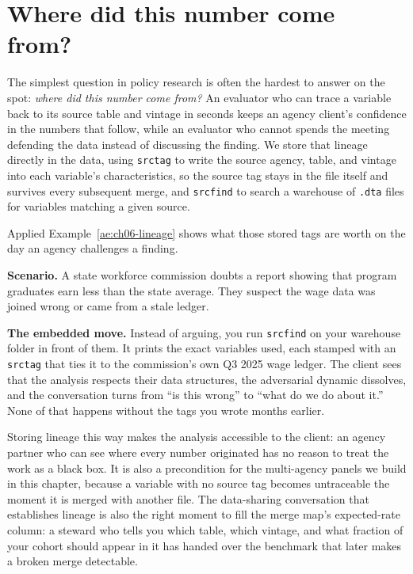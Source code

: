 \section{Where did this number come from?}\label{sec:lineage}
The simplest question in policy research is often the hardest to answer on the spot: \emph{where did this number come from?} An evaluator who can trace a variable back to its source table and vintage in seconds keeps an agency client's confidence in the numbers that follow, while an evaluator who cannot spends the meeting defending the data instead of discussing the finding. We store that lineage directly in the data, using \texttt{srctag} to write the source agency, table, and vintage into each variable's characteristics, so the source tag stays in the file itself and survives every subsequent merge, and \texttt{srcfind} to search a warehouse of \texttt{.dta} files for variables matching a given source.

Applied Example~\ref{ae:ch06-lineage} shows what those stored tags are worth on the day an agency challenges a finding.

\begin{appliedexample}\label{ae:ch06-lineage}
\textbf{Scenario.} A state workforce commission doubts a report showing that program graduates earn less than the state average. They suspect the wage data was joined wrong or came from a stale ledger.

\medskip
\textbf{The embedded move.} Instead of arguing, you run \texttt{srcfind} on your warehouse folder in front of them. It prints the exact variables used, each stamped with an \texttt{srctag} that ties it to the commission's own Q3 2025 wage ledger. The client sees that the analysis respects their data structures, the adversarial dynamic dissolves, and the conversation turns from \enquote{is this wrong} to \enquote{what do we do about it.} None of that happens without the tags you wrote months earlier.
\end{appliedexample}

Storing lineage this way makes the analysis accessible to the client: an agency partner who can see where every number originated has no reason to treat the work as a black box. It is also a precondition for the multi-agency panels we build in this chapter, because a variable with no source tag becomes untraceable the moment it is merged with another file. The data-sharing conversation that establishes lineage is also the right moment to fill the merge map's expected-rate column: a steward who tells you which table, which vintage, and what fraction of your cohort should appear in it has handed over the benchmark that later makes a broken merge detectable.

